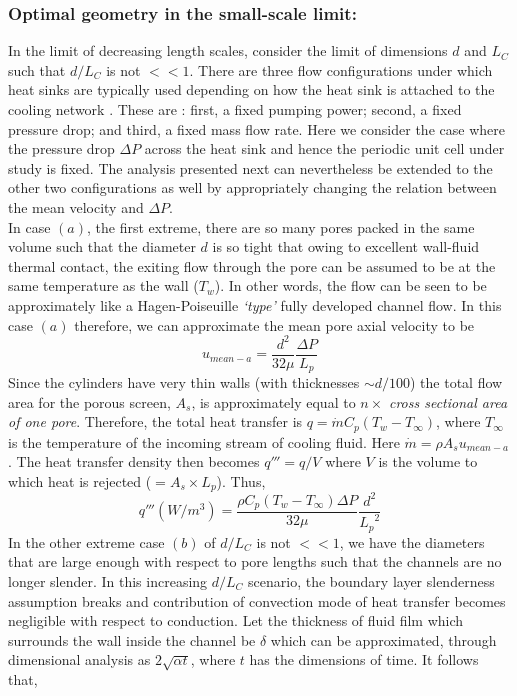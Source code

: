 \documentclass[twocolumn,10pt,cleanfoot]{ihmtc}
\begin{document}
\subsubsection*{Optimal geometry in the small-scale limit:} In the limit of decreasing length scales, consider the limit of dimensions $ d $ and $ L_C $ such that $d/L_C$ is not $<< 1$. There are three flow configurations under which heat sinks are typically used depending on how the heat sink is attached to the cooling network \cite{types_of_cooling_configs}. These are : first, a fixed pumping power; second, a fixed pressure drop; and third, a fixed mass flow rate. Here we consider the case where the pressure drop $ \Delta P $ across the heat sink and hence the periodic unit cell under study is fixed. The analysis presented next can nevertheless be extended to the other two configurations as well by appropriately changing the relation between the mean velocity and $\Delta P$.\\
%
In case $ (a) $, the first extreme, there are so many pores packed in the same volume such that the diameter $ d $ is so tight that owing to excellent wall-fluid thermal contact, the exiting flow through the pore can be assumed to be at the same temperature as the wall ($ T_w $). In other words, the flow can be seen to be approximately like a Hagen-Poiseuille \emph{`type'} fully developed channel flow. In this case $ (a) $ therefore, we can approximate the mean pore axial velocity to be 
%
\[u_{mean-a}=\frac{{d}^{2}}{32\mu }\frac{\Delta P}{{L}_{p}}\]
%
Since the cylinders have very thin walls (with thicknesses $\sim d/100 $) the total flow area for the porous screen, $ A_s $, is approximately equal to $n \times$ {\it cross sectional area of one pore}. Therefore, the total heat transfer is $ q=\dot{m}C_p(T_w-T_\infty) $, where $ T_\infty $ is the temperature of the incoming stream of cooling fluid. Here $\dot{m}=\rho A_s u_{mean-a}$. The heat transfer density then becomes $ q''' =q/V$ where $ V $ is the volume to which heat is rejected ($ =A_s \times L_p$). Thus,
%
\begin{equation}\label{d0}
q'''({W}/{{m}^{3}})=\frac{\rho {{C}_{p}}(T_w-T_\infty)\Delta P}{32\mu }\frac{{{d}^{2}}}{{{L}_{p}}^{2}}
\end{equation}
%
In the other extreme case $ (b) $ of $d/L_C$ is not $<< 1$, we have the diameters that are large enough with respect to pore lengths such that the channels are no longer slender. In this increasing $d/L_C$ scenario, the boundary layer slenderness assumption breaks and contribution of convection mode of heat transfer becomes negligible with respect to conduction. Let the thickness of fluid film which surrounds the wall inside the channel be $ \delta $ which can be approximated, through dimensional analysis as $ 2\sqrt{\alpha t} $, where $t$ has the dimensions of time. It follows that,
\end{document}
